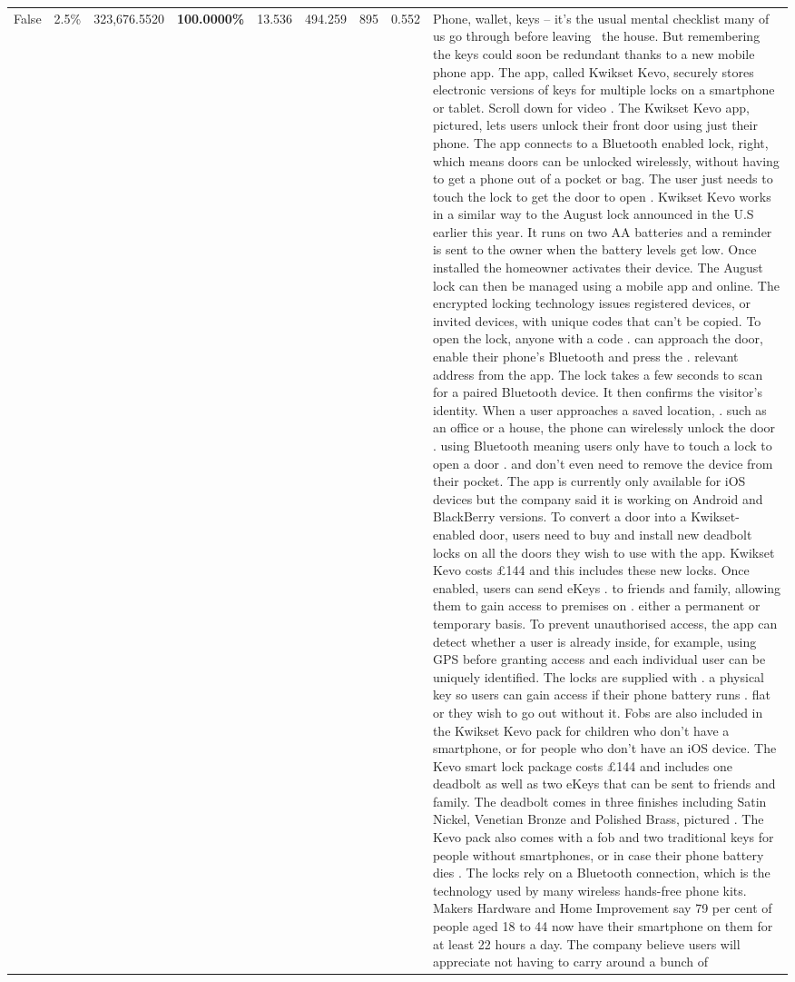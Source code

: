 \begin{table}[H]
\begin{tabular}{lllrlllll}
False & 2.5\% & 323,676.5520 & \bfseries \color{red} 100.0000\% & 13.536 & 494.259 & 895 & 0.552 & Phone, wallet, keys – it’s the usual mental checklist many of us go through before leaving  the house. But remembering the keys could soon be redundant thanks to a new mobile phone app. The app, called Kwikset Kevo, securely stores electronic versions of keys for multiple locks on a smartphone or tablet. Scroll down for video . The Kwikset Kevo app, pictured, lets users unlock their front door using just their phone. The app connects to a Bluetooth enabled lock, right, which means doors can be unlocked wirelessly, without having to get a phone out of a pocket or bag. The user just needs to touch the lock to get the door to open . Kwikset Kevo works in a similar way to the August lock announced in the U.S earlier this year. It runs on two AA batteries and a reminder is sent to the owner when the battery levels get low. Once installed the homeowner activates their device. The August lock can then be managed using a mobile app and online. The encrypted locking technology issues registered devices, or invited devices, with unique codes that can't be copied. To open the lock, anyone with a code . can approach the door, enable their phone's Bluetooth and press the . relevant address from the app. The lock takes a few seconds to scan for a paired Bluetooth device. It then confirms the visitor's identity. When a user approaches a saved location, . such as an office or a house, the phone can wirelessly unlock the door . using Bluetooth meaning users only have to touch a lock to open a door . and don't even need to remove the device from their pocket. The app is currently only available for iOS devices but the company said it is working on Android and BlackBerry versions. To convert a door into a Kwikset-enabled door, users need to buy and install new deadbolt locks on all the doors they wish to use with the app. Kwikset Kevo costs £144 and this includes these new locks. Once enabled, users can send eKeys . to friends and family, allowing them to gain access to premises on . either a permanent or temporary basis. To prevent unauthorised access, the app can detect whether a user is already inside, for example, using GPS before granting access and each individual user can be uniquely identified. The locks are supplied with . a physical key so users can gain access if their phone battery runs . flat or they wish to go out without it. Fobs are also included in the Kwikset Kevo pack for children who don't have a smartphone, or for people who don't have an iOS device. The Kevo smart lock package costs £144 and includes one deadbolt as well as two eKeys that can be sent to friends and family. The deadbolt comes in three finishes including Satin Nickel, Venetian Bronze and Polished Brass, pictured . The Kevo pack also comes with a fob and two traditional keys for people without smartphones, or in case their phone battery dies . The locks rely on a Bluetooth connection, which is the technology used by many wireless hands-free phone kits. Makers Hardware and Home Improvement say 79 per cent of people aged 18 to 44 now have their smartphone on them for at least 22 hours a day. The company believe users will appreciate not having to carry around a bunch of 
\end{tabular}
\end{table}
